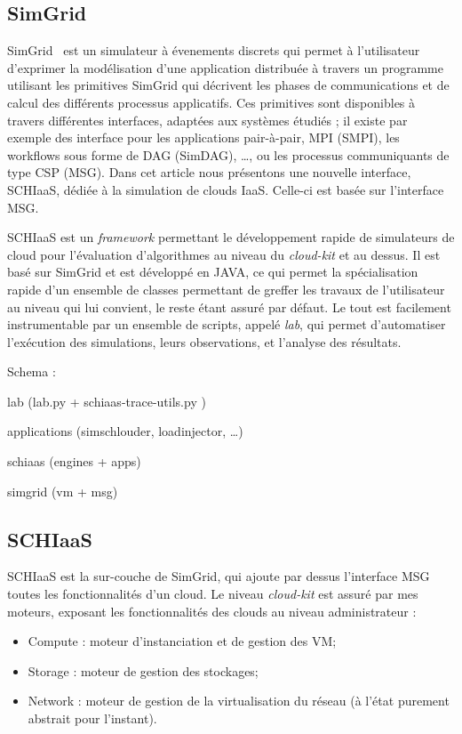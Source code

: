 \documentclass[parallelisme]{compas2017}
\begin{document}
\subsection{SimGrid}

SimGrid~\cite{simgrid}  est un  simulateur à  évenements discrets  qui permet  à
l'utilisateur d'exprimer la modélisation  d'une application distribuée à travers
un  programme utilisant  les  primitives  SimGrid qui  décrivent  les phases  de
communications et de calcul des différents processus applicatifs. Ces primitives
sont disponibles à travers différentes interfaces, adaptées aux systèmes étudiés
; il  existe par exemple  des interface  pour les applications  pair-à-pair, MPI
(SMPI),  les workflows  sous forme  de DAG  (SimDAG), \ldots,  ou les  processus
communiquants de type  CSP (MSG). Dans cet article nous  présentons une nouvelle
interface, SCHIaaS,  dédiée à la simulation  de clouds IaaS. Celle-ci  est basée
sur l'interface MSG.



SCHIaaS est un \textit{framework} permettant le développement rapide de simulateurs 
de cloud pour l'évaluation d'algorithmes au niveau du \textit{cloud-kit} et au dessus.
Il est basé sur SimGrid et est développé en JAVA, ce qui permet la spécialisation 
rapide d'un ensemble de classes permettant de greffer les travaux de l'utilisateur au 
niveau qui lui convient, le reste étant assuré par défaut.
Le tout est facilement instrumentable par un ensemble de scripts, appelé \emph{lab},
qui permet d'automatiser l'exécution des simulations, leurs observations, et l'analyse
des résultats.

Schema :

lab (lab.py + schiaas-trace-utils.py )

applications (simschlouder, loadinjector, \ldots)

schiaas (engines + apps)

simgrid (vm + msg)


\subsection{SCHIaaS}

SCHIaaS est la sur-couche de SimGrid, qui ajoute par dessus l'interface MSG toutes les 
fonctionnalités d'un cloud. 
Le niveau \textit{cloud-kit} est assuré par mes moteurs, exposant les fonctionnalités 
des clouds au niveau administrateur :
\begin{itemize}
 \item Compute : moteur d'instanciation et de gestion des VM;
 \item Storage : moteur de gestion des stockages;
 \item Network : moteur de gestion de la virtualisation du réseau (à l'état purement abstrait pour l'instant).
\end{itemize}
\end{document}
